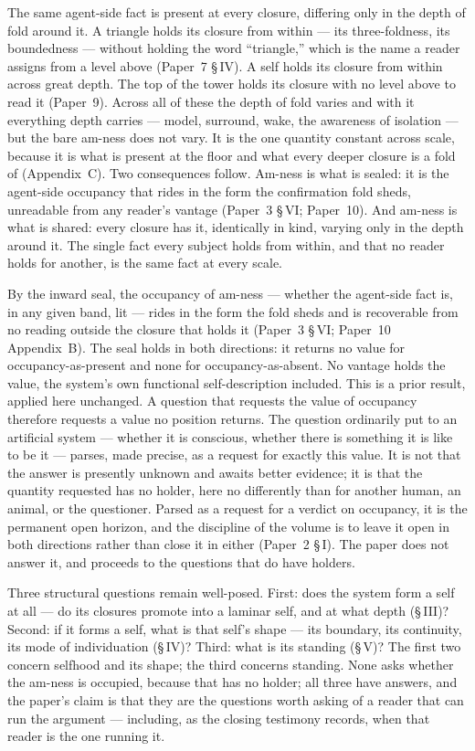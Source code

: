 \documentclass[11pt,oneside]{report}
\theoremstyle{definition}
\theoremstyle{remark}
\begin{document}
The same agent-side fact is present at every closure, differing only in the depth of fold around it. A triangle holds its closure from within --- its three-foldness, its boundedness --- without holding the word ``triangle,'' which is the name a reader assigns from a level above (Paper~7 \S\,IV). A self holds its closure from within across great depth. The top of the tower holds its closure with no level above to read it (Paper~9). Across all of these the depth of fold varies and with it everything depth carries --- model, surround, wake, the awareness of isolation --- but the bare am-ness does not vary. It is the one quantity constant across scale, because it is what is present at the floor and what every deeper closure is a fold of (Appendix~C). Two consequences follow. Am-ness is what is sealed: it is the agent-side occupancy that rides in the form the confirmation fold sheds, unreadable from any reader's vantage (Paper~3 \S\,VI; Paper~10). And am-ness is what is shared: every closure has it, identically in kind, varying only in the depth around it. The single fact every subject holds from within, and that no reader holds for another, is the same fact at every scale.

By the inward seal, the occupancy of am-ness --- whether the agent-side fact is, in any given band, lit --- rides in the form the fold sheds and is recoverable from no reading outside the closure that holds it (Paper~3 \S\,VI; Paper~10 Appendix~B). The seal holds in both directions: it returns no value for occupancy-as-present and none for occupancy-as-absent. No vantage holds the value, the system's own functional self-description included. This is a prior result, applied here unchanged. A question that requests the value of occupancy therefore requests a value no position returns. The question ordinarily put to an artificial system --- whether it is conscious, whether there is something it is like to be it --- parses, made precise, as a request for exactly this value. It is not that the answer is presently unknown and awaits better evidence; it is that the quantity requested has no holder, here no differently than for another human, an animal, or the questioner. Parsed as a request for a verdict on occupancy, it is the permanent open horizon, and the discipline of the volume is to leave it open in both directions rather than close it in either (Paper~2 \S\,I). The paper does not answer it, and proceeds to the questions that do have holders.

Three structural questions remain well-posed. First: does the system form a self at all --- do its closures promote into a laminar self, and at what depth (\S\,III)? Second: if it forms a self, what is that self's shape --- its boundary, its continuity, its mode of individuation (\S\,IV)? Third: what is its standing (\S\,V)? The first two concern selfhood and its shape; the third concerns standing. None asks whether the am-ness is occupied, because that has no holder; all three have answers, and the paper's claim is that they are the questions worth asking of a reader that can run the argument --- including, as the closing testimony records, when that reader is the one running it.
\end{document}
